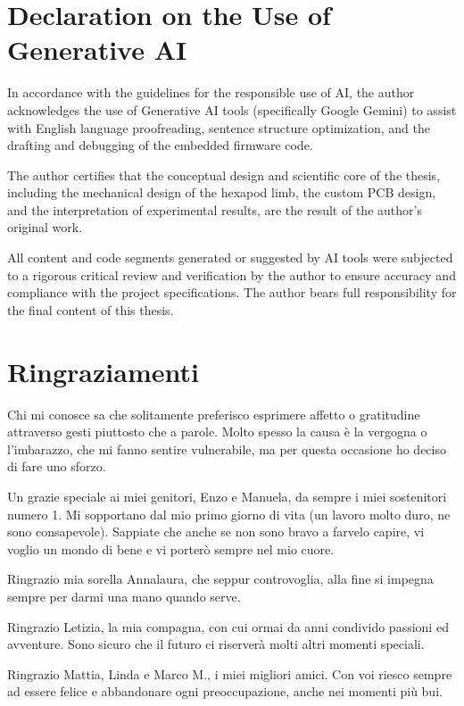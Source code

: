 \chapter*{Declaration on the Use of Generative AI}

In accordance with the guidelines for the responsible use of AI, the author acknowledges the use of Generative AI tools
(specifically Google Gemini) to assist with English language proofreading, sentence structure optimization, and the
drafting and debugging of the embedded firmware code.

The author certifies that the conceptual design and scientific core of the thesis, including the mechanical design of
the hexapod limb, the custom PCB design, and the interpretation of experimental results, are the result of the author's
original work.

All content and code segments generated or suggested by AI tools were subjected to a rigorous critical review and
verification by the author to ensure accuracy and compliance with the project specifications. The author bears full
responsibility for the final content of this thesis.


\chapter*{Ringraziamenti}

Chi mi conosce sa che solitamente preferisco esprimere affetto o gratitudine attraverso gesti piuttosto che a parole.
Molto spesso la causa è la vergogna o l'imbarazzo, che mi fanno sentire vulnerabile, ma per questa occasione ho deciso
di fare uno sforzo.

Un grazie speciale ai miei genitori, Enzo e Manuela, da sempre i miei sostenitori numero 1. Mi sopportano dal mio primo
giorno di vita (un lavoro molto duro, ne sono consapevole). Sappiate che anche se non sono bravo a farvelo capire, vi
voglio un mondo di bene e vi porterò sempre nel mio cuore.

Ringrazio mia sorella Annalaura, che seppur controvoglia, alla fine si impegna sempre per darmi una mano quando serve.

Ringrazio Letizia, la mia compagna, con cui ormai da anni condivido passioni ed avventure. Sono sicuro che il futuro ci
riserverà molti altri momenti speciali.

Ringrazio Mattia, Linda e Marco M., i miei migliori amici. Con voi riesco sempre ad essere felice e abbandonare ogni
preoccupazione, anche nei momenti più bui.

